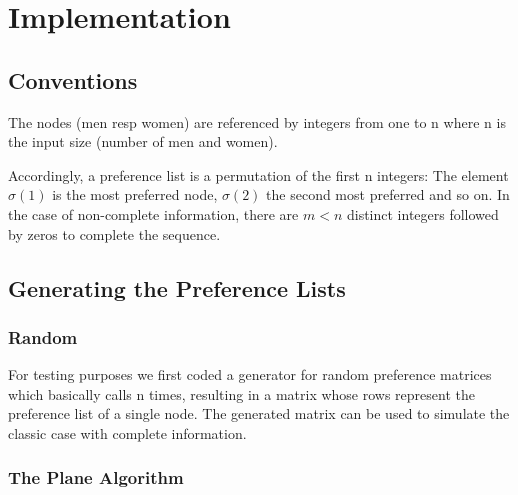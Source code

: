 \documentclass[11pt]{article}
\begin{document}
\section{Implementation}

\subsection{Conventions}

The nodes (men resp women) are referenced by integers from one to n where n is the input
size (number of men and women).

Accordingly, a preference list is a permutation of the first n integers: The element $\sigma(1)$ 
is the most preferred node, $\sigma(2)$ the second most preferred and so on. In the case of 
non-complete information, there are $m<n$ distinct integers followed by zeros to complete the 
sequence.

\subsection{Generating the Preference Lists}

\subsubsection{Random}

For testing purposes we first coded a generator for random preference matrices which 
basically calls  n times, resulting in a matrix whose rows represent the 
preference list of a single node. The generated matrix can be used to simulate the classic 
case with complete information.

\subsubsection{The Plane Algorithm}
\end{document}
